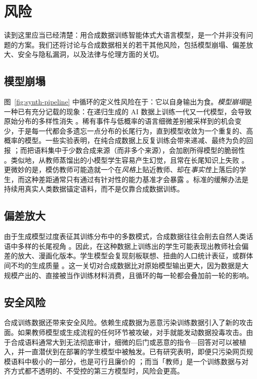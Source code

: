 \section{风险}
\label{sec:risks}

读到这里应当已经清楚：用合成数据训练智能体式大语言模型，是一个并非没有问题的方案。我们还将讨论与合成数据相关的若干其他风险，包括模型崩塌、偏差放大、安全与隐私漏洞，以及法律与伦理方面的关切。

\subsection{模型崩塌}
图~\ref{fig:synth-pipeline} 中循环的定义性风险在于：它以自身输出为食。\emph{模型崩塌}是一种已有充分记载的现象：在递归生成的 AI 数据上训练一代又一代模型，会导致原始分布的多样性消失 \citep{shumailov2024curserecursiontraininggenerated}。稀有事件与低概率的语言细微差别被采样到的机会变少，于是每一代都会多遗忘一点分布的长尾行为，直到模型收敛为一个重复的、高概率的模型。一些实验表明，在纯合成数据上反复训练会带来递减、最终为负的回报 \citep{singh2024beyond}；而把语料集中于少数合成来源（而非多个来源），会加剧所得模型的脆弱性 \citep{schaffelder2025syntheticeggsbasketsimpact}。类似地，从教师蒸馏出的小模型学生容易产生幻觉，且常在长尾知识上失败 \citep{pmlr-v202-kandpal23a}。更微妙的是，模仿教师可能造就一个在\emph{风格}上贴近教师、却在\emph{事实性}上落后的学生，而这种差距通常只有通过有针对性的能力基准才会暴露 \citep{gudibande2023falsepromiseimitatingproprietary}。标准的缓解办法是持续用真实人类数据锚定语料，而不是仅靠合成数据训练。

\subsection{偏差放大}
由于生成模型过度表征其训练分布中的多数模式，合成数据往往会削去自然人类话语中多样的长尾视角 \citep{van-der-meer-etal-2024-empirical}。因此，在这种数据上训练出的学生可能表现出教师社会偏差的放大、漫画化版本。学生模型会复现刻板联想、扭曲的人口统计表征，或群体间不均的生成质量 \citep{gallegos2024bias}。这一关切对合成数据比对原始模型输出更大，因为数据是大规模产出的、直接被当作训练材料消费，且循环的每一轮都会叠加前一轮的影响。

\subsection{安全风险}
合成训练数据还带来安全风险。依赖生成数据为恶意污染训练数据引入了新的攻击面。如果教师模型或生成流程的任何环节被攻破，对手就能发动数据投毒攻击。由于合成语料通常大到无法彻底审计，细微的后门或恶意的指令—回答对可以被植入，并一直潜伏到在部署的学生模型中被触发。已有研究表明，即便只污染网页规模语料中极小的一部分，也是可行且廉价的 \citep{carlini2024poisoning}；而当「教师」是一个训练数据与对齐方式都不透明的、不受控的第三方模型时，风险会更高。

